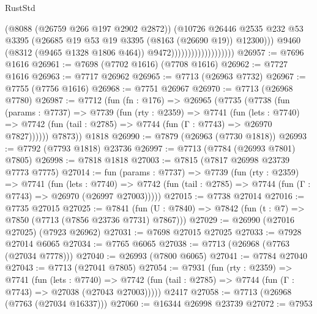 \begin{lexlean}{RustStd}
\begin{coremodule}
                                            (@8088 (@26759 @266 @197 @2902 @2872))
                                            (@10726
                                              @26446
                                              @2535
                                              @232
                                              @53
                                              @3395
                                              (@26685
                                                @19
                                                @53
                                                @19
                                                @3395
                                                (@8163 (@26690 @19))
                                                @12300)))
                                          @9460
                                          (@8312 (@9465 @1328 @1806 @464))
                                          @9472)))))))))))))))))))
@26957 := @7696 @1616
@26961 := @7698 (@7702 @1616) (@7708 @1616)
@26962 := @7727 @1616
@26963 := @7717 @26962
@26965 := @7713 (@26963 @7732)
@26967 := @7755 (@7756 @1616)
@26968 := @7751 @26967
@26970 := @7713 (@26968 @7780)
@26987 := @7712
    (fun (fn : @176) =>
    @26965
      (@7735
        (@7738
          (fun (params : @7737) =>
          @7739
            (fun (rty : @2359) =>
            @7741
              (fun (lets : @7740) =>
              @7742 (fun (tail : @2785) => @7744 (fun (Γ : @7743) => @26970 @7827))))))
        @7873))
    @1818
@26990 := @7879 (@26963 (@7730 @1818))
@26993 := @7792 (@7793 @1818) @23736
@26997 := @7713 (@7784 (@26993 @7801) @7805)
@26998 := @7818 @1818
@27003 := @7815 (@7817 @26998 @23739 @7773 @7775)
@27014 := fun (params : @7737) =>
  @7739
    (fun (rty : @2359) =>
    @7741
      (fun (lets : @7740) =>
      @7742 (fun (tail : @2785) => @7744 (fun (Γ : @7743) => @26970 (@26997 @27003)))))
@27015 := @7738 @27014
@27016 := @7735 @27015
@27025 := @7841
    (fun (U : @7840) => @7842 (fun (t : @7) => @7850 (@7713 (@7856 @23736 @7731) @7867)))
@27029 := @26990 (@27016 @27025) (@7923 @26962)
@27031 := @7698 @27015 @27025
@27033 := @7928 @27014 @6065
@27034 := @7765 @6065
@27038 := @7713 (@26968 (@7763 (@27034 @7778)))
@27040 := @26993 (@7800 @6065)
@27041 := @7784 @27040
@27043 := @7713 (@27041 @7805)
@27054 := @7931
    (fun (rty : @2359) =>
    @7741
      (fun (lets : @7740) =>
      @7742 (fun (tail : @2785) => @7744 (fun (Γ : @7743) => @27038 (@27043 @27003)))))
    @2417
@27058 := @7713 (@26968 (@7763 (@27034 @16337)))
@27060 := @16344 @26998 @23739
@27072 := @7953

\end{coremodule}
\end{lexlean}
